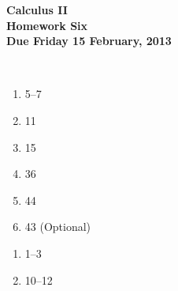 \documentclass[12pt]{article}
\begin{document}
\pagestyle{empty}
 
\begin{center}
{\large {\bf Calculus II}}\\
\medskip
{\large {\bf Homework Six}}\\
\medskip
{ {\bf Due Friday 15 February, 2013}}\\
\end{center}

\hspace{2mm}\\
   


\begin{enumerate}
\setlength{\itemsep}{-1mm}
  \item 5--7
  \item 11
  \item 15
  \item 36
  \item 44
  \item 43 (Optional)
\end{enumerate}


\begin{enumerate}
\setlength{\itemsep}{-1mm}
  \item 1--3
  \item 10--12
\end{enumerate}


%
\end{document}
